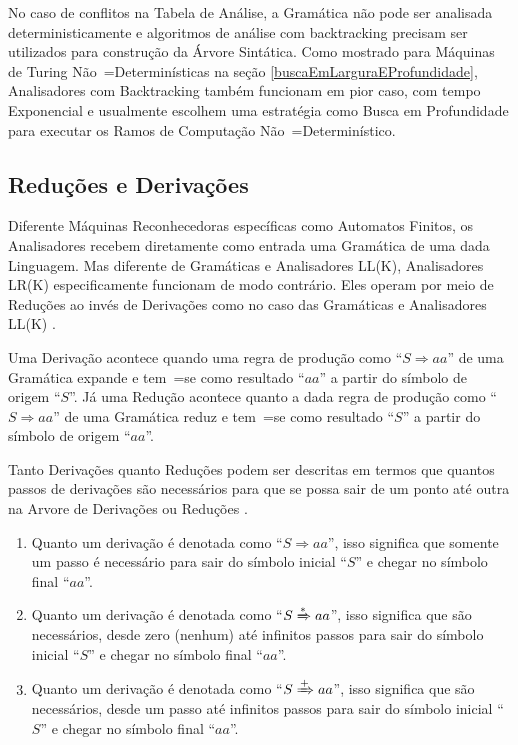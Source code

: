 {    No caso de conflitos na Tabela de Análise,
    a Gramática não pode ser analisada deterministicamente e
    algoritmos de análise com backtracking precisam ser utilizados para construção da Árvore Sintática.
    Como mostrado para Máquinas de Turing Não~=Determinísticas na seção \ref{buscaEmLarguraEProfundidade},
    Analisadores com Backtracking também funcionam em pior caso,
    com tempo Exponencial e
    usualmente escolhem uma estratégia como Busca em Profundidade para executar os Ramos de Computação Não~=Determinístico.


\subsection{Reduções e Derivações}
\label{reducoesEderivacoes}

    Diferente Máquinas Reconhecedoras específicas como Automatos Finitos,
    os Analisadores recebem diretamente como entrada uma Gramática de uma dada Linguagem.
    Mas diferente de Gramáticas e
    Analisadores LL(K),
    Analisadores LR(K) especificamente funcionam de modo contrário.
    Eles operam por meio de Reduções ao invés de Derivações como no caso das Gramáticas e
    Analisadores LL(K) \cite{sipserBook}.

    Uma Derivação acontece quando uma regra de produção como ``$S \Rightarrow a a $'' de uma Gramática expande e
    tem~=se como resultado ``$a a$'' a partir do símbolo de origem ``$S$''.
    Já uma Redução acontece quanto a dada regra de produção como ``$S \Rightarrow a a $'' de uma Gramática reduz e
    tem~=se como resultado ``$S$'' a partir do símbolo de origem ``$a a$''.

    Tanto Derivações quanto Reduções podem ser descritas em termos que quantos passos de derivações são necessários para que se possa sair de um ponto até outra na Arvore de Derivações ou
    Reduções \cite{ahoCompilerDragonBook}.
    \begin{enumerate}%
        \item Quanto um derivação é denotada como ``$S \Rightarrow a a $'',
        isso significa que somente um passo é necessário para sair do símbolo inicial ``$S$'' e
        chegar no símbolo final ``$a a$''.
        \item Quanto um derivação é denotada como ``$S \xRightarrow{*} a a $'',
        isso significa que são necessários,
        desde zero (nenhum) até infinitos passos para sair do símbolo inicial ``$S$'' e
        chegar no símbolo final ``$a a$''.
        \item Quanto um derivação é denotada como ``$S \xRightarrow{+} a a $'',
        isso significa que são necessários,
        desde um passo até infinitos passos para sair do símbolo inicial ``$S$'' e
        chegar no símbolo final ``$a a$''.
    \end{enumerate}

}
